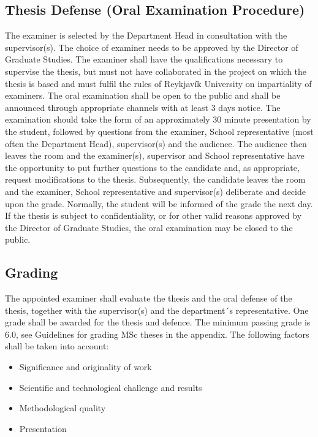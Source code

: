 \subsection{Thesis Defense (Oral Examination Procedure)}
The examiner is selected by the Department Head in consultation with the supervisor(s).  
The choice of examiner needs to be approved by the Director of Graduate Studies.  
The examiner shall have the qualifications necessary to supervise the thesis, but must not have collaborated in the project on which the thesis is based and must fulfil the rules of Reykjavík University on impartiality of examiners.
The oral examination shall be open to the public and shall be announced through appropriate channels with at least 3 days notice.  
The examination should take the form of an approximately 30 minute presentation by the student, followed by questions from the examiner, School representative (most often the Department Head), supervisor(s) and the audience.  
The audience then leaves the room and the examiner(s), supervisor and School representative have the opportunity to put further questions to the candidate and, as appropriate, request modifications to the thesis.  
Subsequently, the candidate leaves the room and the examiner, School representative and supervisor(s) deliberate and decide upon the grade.  
Normally, the student will be informed of the grade the next day.  
If the thesis is subject to confidentiality, or for other valid reasons approved by the Director of Graduate Studies, the oral examination may be closed to the public.
\subsection{Grading}
The appointed examiner shall evaluate the thesis and the oral defense of the thesis, together with the
supervisor(s) and the department´s representative.  
One grade shall be awarded for the thesis and defence.  
The minimum passing grade is 6.0, see Guidelines for grading MSc theses in the appendix.  
The following factors shall be taken into account:

\begin{itemize}
\item Significance and originality of work
\item Scientific and technological challenge and results
\item Methodological quality
\item Presentation
\end{itemize}

